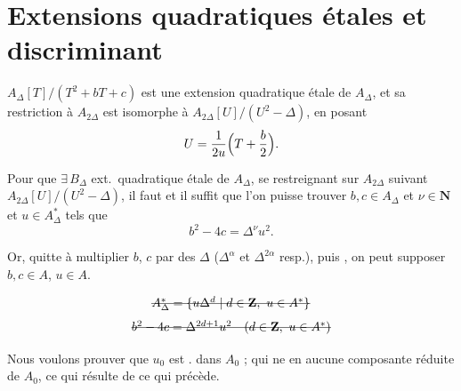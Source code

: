 \documentclass[11pt,a4paper]{article}
\begin{document}
\section{Extensions quadratiques étales et discriminant}


\ill{} $A_\Delta[T]/(T^2+bT+c)$ est une extension quadratique étale de $A_\Delta$, et sa restriction à $A_{2\Delta}$ est isomorphe à $A_{2\Delta}[U]/(U^2-\Delta)$, en posant
\[
U=\frac{1}{2u}\Bigl(T+\frac{b}{2}\Bigr).
\]


 

Pour que $\exists\, B_\Delta$ ext.\ quadratique étale de $A_\Delta$, se restreignant sur $A_{2\Delta}$ suivant $A_{2\Delta}[U]/(U^2-\Delta)$, il faut et il suffit que l'on puisse trouver $b,c\in A_\Delta$ et $\nu\in\mathbf{N}$ et $u\in A_\Delta^{*}$ tels que
\[
b^2-4c=\Delta^{\nu}u^2 .
\]

Or, quitte à multiplier $b$, $c$ par des   $\Delta$ ($\Delta^{\alpha}$ et $\Delta^{2\alpha}$ resp.), puis \ill{}, on peut supposer $b,c\in A$, \struck{\ill{}} $u\in A$.

\[
\text{\struck{$A_\Delta^{*}=\{u\Delta^{d}\mid d\in\mathbf{Z},\ u\in A^{*}\}$}}
\]
\[
\text{\struck{$b^2-4c=\Delta^{2d+1}u^2\quad (d\in\mathbf{Z},\ u\in A^{*})$}}
\]



Nous voulons prouver que $u_0$ est .   \ill{}  dans $A_0$ ; \ill{} qui ne \ill{} en aucune composante \ill{} réduite de $A_0$, ce qui résulte de \ill{} ce qui précède.
\end{document}
